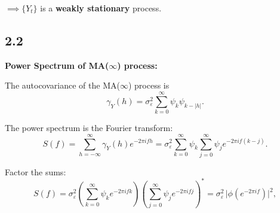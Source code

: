 \documentclass[11pt]{article}
\begin{document}
\begin{solution}
\(\implies \{Y_t\}\) is a \textbf{weakly stationary} process.

\subsection*{2.2}
\textbf{Power Spectrum of MA($\infty$) process:}

The autocovariance of the MA($\infty$) process is
\[
\gamma_Y(h) = \sigma_\varepsilon^2 \sum_{k=0}^{\infty} \psi_k \psi_{k-|h|}.
\]

The power spectrum is the Fourier transform:
\[
S(f) = \sum_{h=-\infty}^{\infty} \gamma_Y(h) e^{-2\pi i f h} 
= \sigma_\varepsilon^2 \sum_{k=0}^{\infty} \psi_k \sum_{j=0}^{\infty} \psi_j e^{-2\pi i f (k-j)}.
\]

Factor the sums:
\[
S(f) = \sigma_\varepsilon^2 \left( \sum_{k=0}^{\infty} \psi_k e^{-2\pi i f k} \right) \left( \sum_{j=0}^{\infty} \psi_j e^{-2\pi i f j} \right)^* 
= \sigma_\varepsilon^2 \, \big| \phi(e^{-2\pi i f}) \big|^2,
\]

\end{solution}
\end{document}
